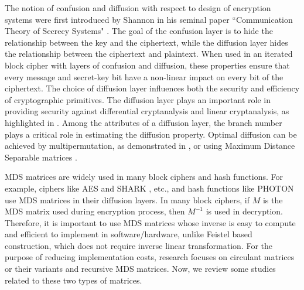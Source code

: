\documentclass[12pt]{article}
\begin{document}
The notion of confusion and diffusion with respect to design of encryption systems were first introduced by  Shannon in his seminal paper ``Communication Theory of Secrecy Systems" \cite{shannon1949communication}. The goal of the confusion layer is to hide the relationship between the key and the ciphertext, while the diffusion layer hides the relationship between the ciphertext and plaintext. When used in an iterated block cipher with layers of confusion and diffusion, these properties ensure that every message  and  secret-key bit have a non-linear impact on every bit of the ciphertext. The choice of diffusion layer influences both the security and efficiency of  cryptographic primitives. The diffusion layer plays an important role in providing security against differential cryptanalysis and linear cryptanalysis, as highlighted in \cite{daemen2002design}.  Among the attributes of a diffusion layer, the branch number \cite{daemen2002design} plays a critical role in estimating the diffusion property. Optimal diffusion can be achieved by multipermutation, as demonstrated in \cite{schnorr1994black, vaudenay1994need}, or using Maximum Distance Separable matrices \cite{daemen2002design}.

MDS matrices are widely used in many block ciphers and hash functions. For example, ciphers like AES \cite{daemen2002design} and SHARK \cite{rijmen1996cipher}, etc., and hash functions like PHOTON \cite{guo2011photon}  use MDS matrices in their diffusion layers. In many block ciphers, if $M$ is the MDS matrix used during encryption process, then $M^{-1}$ is used in decryption. Therefore, it is  important to use MDS matrices whose inverse is easy to compute and efficient to implement in software/hardware, unlike  Feistel based construction, which does not require inverse linear transformation. For the purpose of reducing implementation costs, research focuses on  circulant matrices or their variants and recursive MDS matrices. Now, we review some studies related to these two types of matrices.
\end{document}
